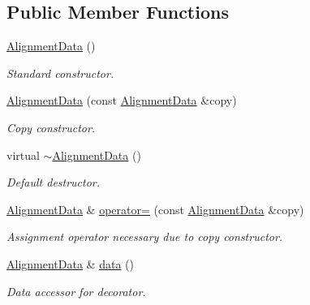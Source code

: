 \subsection*{Public Member Functions}
\begin{DoxyCompactItemize}
\item 
\hyperlink{class_d_d4hep_1_1_alignments_1_1_alignment_data_a0147080f238040fbab7467bb22ade3dc}{AlignmentData} ()
\begin{DoxyCompactList}\small\item\em Standard constructor. \item\end{DoxyCompactList}\item 
\hyperlink{class_d_d4hep_1_1_alignments_1_1_alignment_data_a5bb5d24d5baeef53da5feac655612362}{AlignmentData} (const \hyperlink{class_d_d4hep_1_1_alignments_1_1_alignment_data}{AlignmentData} \&copy)
\begin{DoxyCompactList}\small\item\em Copy constructor. \item\end{DoxyCompactList}\item 
virtual \hyperlink{class_d_d4hep_1_1_alignments_1_1_alignment_data_a1bbd0f76cea046a48fdeee46396b6e5c}{$\sim$AlignmentData} ()
\begin{DoxyCompactList}\small\item\em Default destructor. \item\end{DoxyCompactList}\item 
\hyperlink{class_d_d4hep_1_1_alignments_1_1_alignment_data}{AlignmentData} \& \hyperlink{class_d_d4hep_1_1_alignments_1_1_alignment_data_a52c323f2dd5393ea5d9e77f8df11c6d0}{operator=} (const \hyperlink{class_d_d4hep_1_1_alignments_1_1_alignment_data}{AlignmentData} \&copy)
\begin{DoxyCompactList}\small\item\em Assignment operator necessary due to copy constructor. \item\end{DoxyCompactList}\item 
\hyperlink{class_d_d4hep_1_1_alignments_1_1_alignment_data}{AlignmentData} \& \hyperlink{class_d_d4hep_1_1_alignments_1_1_alignment_data_a9149a3648883a4d6d941e9b1270599b4}{data} ()
\begin{DoxyCompactList}\small\item\em Data accessor for decorator. \item\end{DoxyCompactList}\item 

\end{DoxyCompactItemize}
